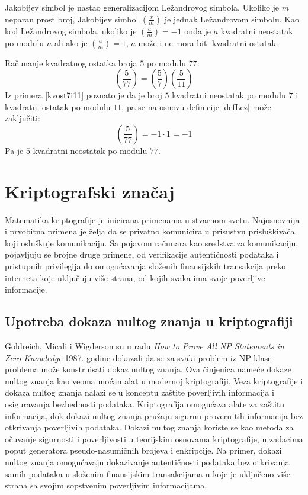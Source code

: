Jakobijev simbol je nastao generalizacijom Ležandrovog simbola. Ukoliko je $m$ neparan prost broj, Jakobijev simbol $\left ( \frac{x}{m} \right )$ je jednak Ležandrovom simbolu. Kao kod Ležandrovog simbola, ukoliko je $\left (\frac{a}{m} \right )=-1$ onda je $a$ kvadratni neostatak po modulu $n$ ali ako je $\left (\frac{a}{m} \right )=1$, $a$ može i ne mora biti kvadratni ostatak.

\begin{npra}
	\label{primer77}
	Računanje kvadratnog ostatka broja $5$ po modulu $77$:
	$$\left (\frac{5}{77} \right ) = \left (\frac{5}{7} \right )\left (\frac{5}{11} \right )$$
	Iz primera \ref{kvost7i11} poznato je da je broj $5$ kvadratni neostatak po modulu $7$ i kvadratni ostatak po modulu $11$, pa se na osnovu definicije \ref{defLez} može zaključiti:
	$$\left (\frac{5}{77} \right ) = -1 \cdot 1 = -1$$
	Pa je $5$ kvadratni neostatak po modulu $77$.
\end{npra}


\chapter{Kriptografski značaj}
Matematika kriptografije je inicirana primenama u stvarnom svetu. Najosnovnija i prvobitna primena  je želja da se privatno komunicira u prisustvu prisluškivača koji osluškuje komunikaciju. Sa pojavom računara kao sredstva za komunikaciju, pojavljuju se brojne druge primene, od verifikacije autentičnosti podataka i pristupnih privilegija do omogućavanja složenih finansijskih transakcija preko interneta koje uključuju više strana, od kojih svaka ima svoje poverljive informacije.

\section{Upotreba dokaza nultog znanja u kriptografiji}

\textenglish{Goldreich, Micali} i \textenglish{Wigderson} su u radu \textenglish{\it How to Prove All NP Statements in Zero-Knowledge} 1987. godine dokazali da se za svaki problem iz \textenglish{NP} klase problema može konstruisati dokaz nultog znanja\cite{inproceedings}. Ova činjenica nameće dokaze nultog znanja kao veoma moćan alat u modernoj kriptografiji. Veza kriptografije i dokaza nultog znanja nalazi se u konceptu zaštite poverljivih informacija i osiguravanja bezbednosti podataka. Kriptografija omogućava alate za zaštitu informacija, dok dokazi nultog znanja pružaju sigurnu proveru tih informacija bez otkrivanja poverljivih podataka. Dokazi nultog znanja koriste se kao metoda za očuvanje sigurnosti i poverljivosti u teorijskim osnovama kriptografije, u zadacima poput generatora pseudo-nasumičnih brojeva i  enkripcije. Na primer, dokazi nultog znanja omogućavaju dokazivanje autentičnosti podataka bez otkrivanja samih podataka u složenim finansijskim transakcijama u koje je uključeno više strana sa svojim sopstvenim poverljivim informacijama\cite{goldwasser2002mathematicalfoundationsmoderncryptography}.\\

